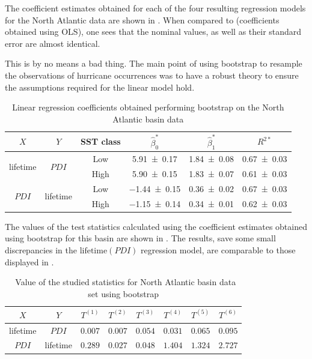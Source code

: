 The coefficient estimates obtained for each of the four resulting regression models for the North Atlantic data are shown in . When compared to  (coefficients obtained using OLS), one sees that the nominal values, as well as their standard error are almost identical.

This is by no means a bad thing. The main point of using bootstrap to resample the observations of hurricane occurrences was to have a robust theory to ensure the assumptions required for the linear model hold.

\begin{table}[H]
	\centering
	\begin{tabular}{cccccc}
		\toprule
		\toprule
		$X$ & $Y$ & SST class & $\hat{\beta}_{0}^{\ast}$ & $\hat{\beta}_{1}^{\ast}$ & $R^{2\ast}$ \\
		\midrule
		\multirow{2}{*}{lifetime} & \multirow{2}{*}{$PDI$}
		 & Low  & \num{ 5.91 \pm 0.17} & \num{1.84 \pm 0.08} & \num{0.67 \pm 0.03} \\
		&& High & \num{ 5.90 \pm 0.15} & \num{1.83 \pm 0.07} & \num{0.61 \pm 0.03} \\
		\midrule
		\multirow{2}{*}{$PDI$} & \multirow{2}{*}{lifetime}
		 & Low  & \num{-1.44 \pm 0.15} & \num{0.36 \pm 0.02} & \num{0.67 \pm 0.03} \\
		&& High & \num{-1.15 \pm 0.14} & \num{0.34 \pm 0.01} & \num{0.62 \pm 0.03} \\
		\bottomrule
	\end{tabular}
	\caption{Linear regression coefficients obtained performing bootstrap on the North Atlantic basin data}
	\label{tab:natl-boot-coefs}
\end{table}

The values of the test statistics calculated using the coefficient estimates obtained using bootstrap for this basin are shown in . The results, save some small discrepancies in the $\text{lifetime}(PDI)$ regression model, are comparable to those displayed in .
\begin{table}[H]
	\centering
	\begin{tabular}{cccccccc}
	\toprule
	\toprule
	$X$   & $Y$   & $T^{(1)}$ & $T^{(2)}$ & $T^{(3)}$ & $T^{(4)}$ & $T^{(5)}$ & $T^{(6)}$ \\
	\midrule
	lifetime & $PDI$ & $0.007$ & $0.007$ & $0.054$ & $0.031$ & $0.065$ & $0.095$ \\
	$PDI$ & lifetime & $0.289$ & $0.027$ & $0.048$ & $1.404$ & $1.324$ & $2.727$ \\
	\bottomrule
	\end{tabular}
	\caption{~Value of the studied statistics for North Atlantic basin data set using bootstrap}
	\label{tab:base-natl-boot-statistics}
\end{table}

